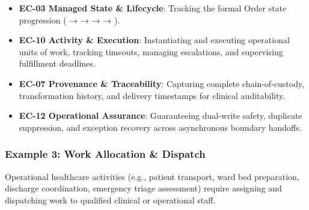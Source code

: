 \begin{itemize}
\begin{itemize}
\item 
\textbf{EC-03 Managed State \& Lifecycle}: Tracking the formal Order state progression (\texttt{} → \texttt{} → \texttt{} → \texttt{} → \texttt{}).



\item 
\textbf{EC-10 Activity \& Execution}: Instantiating and executing operational units of work, tracking timeouts, managing escalations, and supervising fulfillment deadlines.



\item 
\textbf{EC-07 Provenance \& Traceability}: Capturing complete chain-of-custody, transformation history, and delivery timestamps for clinical auditability.



\item 
\textbf{EC-12 Operational Assurance}: Guaranteeing dual-write safety, duplicate suppression, and exception recovery across asynchronous boundary handoffs.



\end{itemize}


\end{itemize}
\label{rad:tier-model:229}

\par\smallskip
{}\label{rad:tier-model:231}
\subsubsection*{Example 3: Work Allocation \& Dispatch}
\label{rad:tier-model:233}

Operational healthcare activities (e.g., patient transport, ward bed preparation, discharge coordination, emergency triage assessment) require assigning and dispatching work to qualified clinical or operational staff.

\label{rad:tier-model:235}

